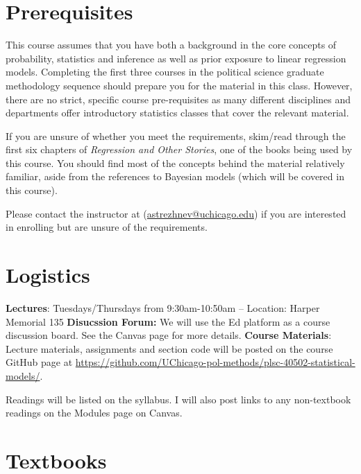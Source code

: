 \documentclass[11pt, article, oneside]{memoir}
\theoremstyle{Assumption}
\begin{document}
\section*{Prerequisites}

This course assumes that you have both a background in the core concepts of probability, statistics and inference as well as prior exposure to linear regression models. Completing the first three courses in the political science graduate methodology sequence should prepare you for the material in this class. However, there are no strict, specific course pre-requisites as many different disciplines and departments offer introductory statistics classes that cover the relevant material.

If you are unsure of whether you meet the requirements, skim/read through the first six chapters of \textit{Regression and Other Stories}, one of the books being used by this course. You should find most of the concepts behind the material relatively familiar, aside from the references to Bayesian models (which will be covered in this course).

Please contact the instructor at (\href{mailto:astrezhnev@uchicago.edu}{astrezhnev@uchicago.edu}) if you are interested in enrolling but are unsure of the requirements. 

\section*{Logistics}

\textbf{Lectures}: Tuesdays/Thursdays from 9:30am-10:50am -- Location: Harper Memorial 135
\newline\newline \textbf{Disucssion Forum:} We will use the Ed platform as a course discussion board. See the Canvas page for more details.
\newline\newline\textbf{Course Materials}: Lecture materials, assignments and section code will be posted on the course GitHub page at \url{https://github.com/UChicago-pol-methods/plsc-40502-statistical-models/}.

Readings will be listed on the syllabus. I will also post links to any non-textbook readings on the Modules page on Canvas.

\section*{Textbooks} 
\end{document}
